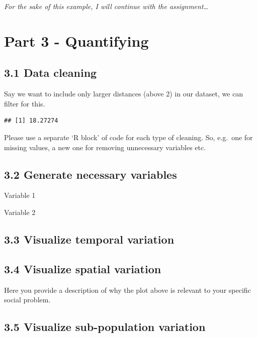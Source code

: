 \documentclass[
]{article}
\newenvironment{Shaded}{\begin{snugshade}}{\end{snugshade}}
\newcommand{\FunctionTok}[1]{\textcolor[rgb]{0.13,0.29,0.53}{\textbf{#1}}}
\newcommand{\NormalTok}[1]{#1}
\newcommand{\SpecialCharTok}[1]{\textcolor[rgb]{0.81,0.36,0.00}{\textbf{#1}}}
\begin{document}
\emph{For the sake of this example, I will continue with the
assignment\ldots{}}

\section{Part 3 - Quantifying}\label{part-3---quantifying}

\subsection{3.1 Data cleaning}\label{data-cleaning}

Say we want to include only larger distances (above 2) in our dataset,
we can filter for this.

\begin{Shaded}
\end{Shaded}

\begin{verbatim}
## [1] 18.27274
\end{verbatim}

Please use a separate `R block' of code for each type of cleaning. So,
e.g.~one for missing values, a new one for removing unnecessary
variables etc.

\subsection{3.2 Generate necessary
variables}\label{generate-necessary-variables}

Variable 1

Variable 2

\subsection{3.3 Visualize temporal
variation}\label{visualize-temporal-variation}

\subsection{3.4 Visualize spatial
variation}\label{visualize-spatial-variation}

Here you provide a description of why the plot above is relevant to your
specific social problem.

\subsection{3.5 Visualize sub-population
variation}\label{visualize-sub-population-variation}
\end{document}
